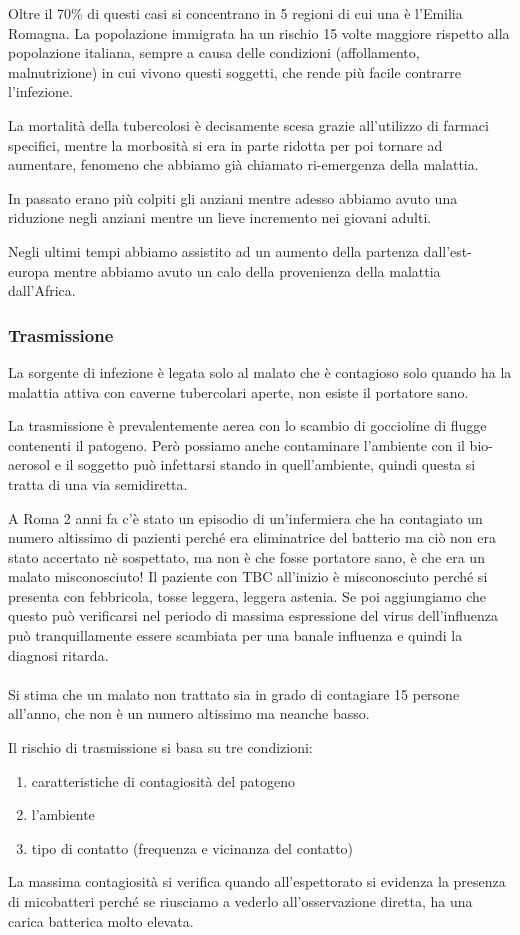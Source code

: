 Oltre il 70\% di questi casi si concentrano in 5 regioni di cui una è
l'Emilia Romagna. La popolazione immigrata ha un rischio 15 volte
maggiore rispetto alla popolazione italiana, sempre a causa delle
condizioni (affollamento, malnutrizione) in cui vivono questi soggetti,
che rende più facile contrarre l'infezione.

La mortalità della tubercolosi è decisamente scesa grazie all'utilizzo
di farmaci specifici, mentre la morbosità si era in parte ridotta per
poi tornare ad aumentare, fenomeno che abbiamo già chiamato ri-emergenza
della malattia.

In passato erano più colpiti gli anziani mentre adesso abbiamo avuto una
riduzione negli anziani mentre un lieve incremento nei giovani adulti.

Negli ultimi tempi abbiamo assistito ad un aumento della partenza
dall'est-europa mentre abbiamo avuto un calo della provenienza della
malattia dall'Africa.

\subsubsection{Trasmissione}


La sorgente di infezione è legata solo al malato che è contagioso solo
quando ha la malattia attiva con caverne tubercolari aperte, non esiste
il portatore sano.

La trasmissione è prevalentemente aerea con lo scambio di goccioline di
flugge contenenti il patogeno. Però possiamo anche contaminare
l'ambiente con il bio-aerosol e il soggetto può infettarsi stando in
quell'ambiente, quindi questa si tratta di una via semidiretta.

A Roma 2 anni fa c'è stato un episodio di un'infermiera che ha
contagiato un numero altissimo di pazienti perché era eliminatrice del
batterio ma ciò non era stato accertato nè sospettato, ma non è che
fosse portatore sano, è che era un malato misconosciuto! Il paziente con
TBC all'inizio è misconosciuto perché si presenta con febbricola, tosse
leggera, leggera astenia. Se poi aggiungiamo che questo può verificarsi
nel periodo di massima espressione del virus dell'influenza può
tranquillamente essere scambiata per una banale influenza e quindi la
diagnosi ritarda.
\\\\
Si stima che un malato non trattato sia in grado di contagiare 15
persone all'anno, che non è un numero altissimo ma neanche basso.

Il rischio di trasmissione si basa su tre condizioni:
\begin{enumerate}

\item  caratteristiche di contagiosità del patogeno

\item l'ambiente

\item  tipo di contatto (frequenza e vicinanza del contatto)
\end{enumerate}
La massima contagiosità si verifica quando all'espettorato si evidenza
la presenza di micobatteri perché se riusciamo a vederlo
all'osservazione diretta, ha una carica batterica molto elevata.

